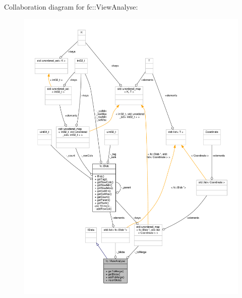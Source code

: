 Collaboration diagram for fc\+:\+:View\+Analyse\+:
\nopagebreak
\begin{figure}[H]
\begin{center}
\leavevmode
\includegraphics[width=350pt]{d3/d5c/classfc_1_1ViewAnalyse__coll__graph}
\end{center}
\end{figure}
